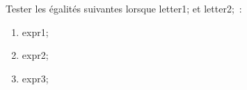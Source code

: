 \documentclass[exercice]{thedocument}%
\begin{document}
%
Tester les égalités suivantes lorsque \<letter1; et \<letter2;~:
\begin{enumerate}
    \item \<expr1;
    \item \<expr2;
    \item \<expr3;
\end{enumerate}
\end{document}
